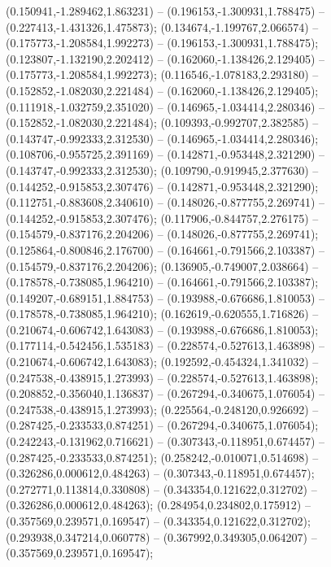  (0.150941,-1.289462,1.863231) -- (0.196153,-1.300931,1.788475) -- (0.227413,-1.431326,1.475873);
 (0.134674,-1.199767,2.066574) -- (0.175773,-1.208584,1.992273) -- (0.196153,-1.300931,1.788475);
 (0.123807,-1.132190,2.202412) -- (0.162060,-1.138426,2.129405) -- (0.175773,-1.208584,1.992273);
 (0.116546,-1.078183,2.293180) -- (0.152852,-1.082030,2.221484) -- (0.162060,-1.138426,2.129405);
 (0.111918,-1.032759,2.351020) -- (0.146965,-1.034414,2.280346) -- (0.152852,-1.082030,2.221484);
 (0.109393,-0.992707,2.382585) -- (0.143747,-0.992333,2.312530) -- (0.146965,-1.034414,2.280346);
 (0.108706,-0.955725,2.391169) -- (0.142871,-0.953448,2.321290) -- (0.143747,-0.992333,2.312530);
 (0.109790,-0.919945,2.377630) -- (0.144252,-0.915853,2.307476) -- (0.142871,-0.953448,2.321290);
 (0.112751,-0.883608,2.340610) -- (0.148026,-0.877755,2.269741) -- (0.144252,-0.915853,2.307476);
 (0.117906,-0.844757,2.276175) -- (0.154579,-0.837176,2.204206) -- (0.148026,-0.877755,2.269741);
 (0.125864,-0.800846,2.176700) -- (0.164661,-0.791566,2.103387) -- (0.154579,-0.837176,2.204206);
 (0.136905,-0.749007,2.038664) -- (0.178578,-0.738085,1.964210) -- (0.164661,-0.791566,2.103387);
 (0.149207,-0.689151,1.884753) -- (0.193988,-0.676686,1.810053) -- (0.178578,-0.738085,1.964210);
 (0.162619,-0.620555,1.716826) -- (0.210674,-0.606742,1.643083) -- (0.193988,-0.676686,1.810053);
 (0.177114,-0.542456,1.535183) -- (0.228574,-0.527613,1.463898) -- (0.210674,-0.606742,1.643083);
 (0.192592,-0.454324,1.341032) -- (0.247538,-0.438915,1.273993) -- (0.228574,-0.527613,1.463898);
 (0.208852,-0.356040,1.136837) -- (0.267294,-0.340675,1.076054) -- (0.247538,-0.438915,1.273993);
 (0.225564,-0.248120,0.926692) -- (0.287425,-0.233533,0.874251) -- (0.267294,-0.340675,1.076054);
 (0.242243,-0.131962,0.716621) -- (0.307343,-0.118951,0.674457) -- (0.287425,-0.233533,0.874251);
 (0.258242,-0.010071,0.514698) -- (0.326286,0.000612,0.484263) -- (0.307343,-0.118951,0.674457);
 (0.272771,0.113814,0.330808) -- (0.343354,0.121622,0.312702) -- (0.326286,0.000612,0.484263);
 (0.284954,0.234802,0.175912) -- (0.357569,0.239571,0.169547) -- (0.343354,0.121622,0.312702);
 (0.293938,0.347214,0.060778) -- (0.367992,0.349305,0.064207) -- (0.357569,0.239571,0.169547);
